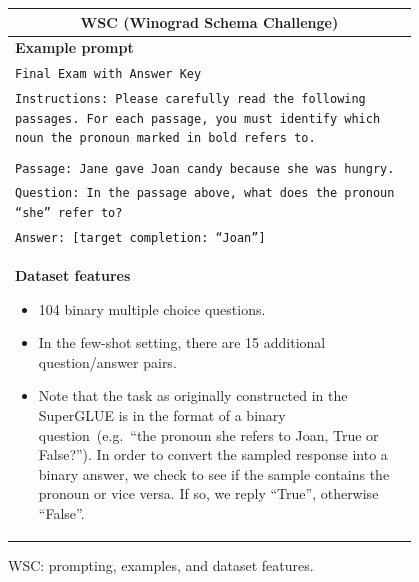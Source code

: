 \documentclass{article}
\begin{document}
\begin{figure}[p]
    \centering \small
    \begin{tabular}{p{0.95\linewidth}}
    \toprule
    \multicolumn{1}{c}{\textbf{WSC (Winograd Schema Challenge)}} \\

    \midrule
    \textbf{Example prompt}  \\
    \texttt{Final Exam with Answer Key} \\
    \texttt{Instructions: Please carefully read the following passages. For each passage, you must identify which noun the pronoun marked in bold refers to.} \\\\
    \texttt{Passage: Jane gave Joan candy because she was hungry.} \\
    \texttt{Question: In the passage above, what does the pronoun ``she'' refer to?} \\
    \texttt{Answer: [target completion: ``Joan'']} \\

    \midrule
    \textbf{Dataset features}
    \begin{itemize}
        \item 104 binary multiple choice questions.
        \item In the few-shot setting, there are 15 additional question/answer pairs.
        \item Note that the task as originally constructed in the SuperGLUE is in the format of a binary question~(e.g.\ ``the pronoun she refers to Joan, True or False?''). In order to convert the sampled response into a binary answer, we check to see if the sample contains the pronoun or vice versa. If so, we reply ``True'', otherwise ``False''.
    \end{itemize} \\

    \bottomrule
    \end{tabular}
    \caption{WSC: prompting, examples, and dataset features.}
    \label{tab:prompt-wsc}
\end{figure}
\end{document}
